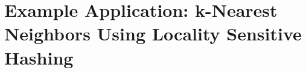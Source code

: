\section{Example Application: k-Nearest Neighbors Using Locality Sensitive Hashing}

\cite{own_lsh_knn}
\cite{own_master_thesis}
\cite{own_bachelor_thesis}
